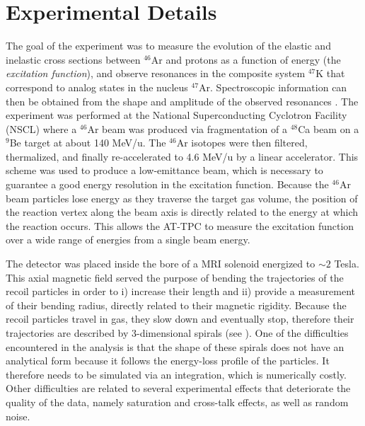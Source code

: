 \documentclass[review,number,sort&compress]{elsarticle}
\begin{document}
\section{Experimental Details} 
The goal of the experiment was to measure the evolution of the elastic and inelastic cross sections between $^{46}$Ar and protons as a function of energy (the {\em excitation function}), and observe resonances in the composite system $^{47}$K that correspond to analog states in the nucleus $^{47}$Ar. Spectroscopic information can then be obtained from the shape and amplitude of the observed resonances \cite{Bradt2018}. 
The experiment was performed at the National Superconducting Cyclotron Facility (NSCL) where a $^{46}$Ar beam was produced via fragmentation of a $^{48}$Ca beam on a $^9$Be target at about 140 MeV/u. The $^{46}$Ar isotopes were then filtered, thermalized, and finally re-accelerated to 4.6 MeV/u by a linear accelerator. This scheme was used to produce a low-emittance beam, which is necessary to guarantee a good energy resolution in the excitation function. Because the  $^{46}$Ar beam particles lose energy as they traverse the target gas volume, the position of the reaction vertex along the beam axis is directly related to the energy at which the reaction occurs. This allows the AT-TPC to measure the excitation function over a wide range of energies from a single beam energy.

The detector was placed inside the bore of a MRI solenoid energized to $\sim 2$ Tesla. This axial magnetic field served the purpose of bending the trajectories of the recoil particles in order to i) increase their length and ii) provide a measurement of their bending radius, directly related to their magnetic rigidity. Because the recoil particles travel in gas, they slow down and eventually stop, therefore their trajectories are described by 3-dimensional spirals (see \cite{Bradt2017}). One of the difficulties encountered in the analysis is that the shape of these spirals does not have an analytical form because it follows the energy-loss profile of the particles. It therefore needs to be simulated via an integration, which is numerically costly. Other difficulties are related to several experimental effects that deteriorate the quality of the data, namely saturation and cross-talk effects, as well as random noise. 
\end{document}
